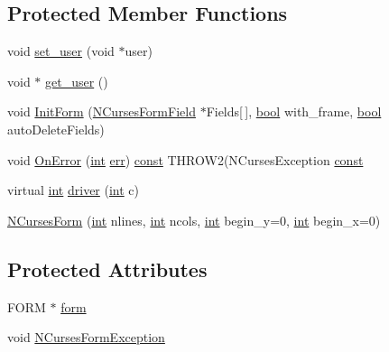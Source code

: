 \subsection*{Protected Member Functions}
\begin{DoxyCompactItemize}
\item 
void \hyperlink{class_n_curses_form_a6f2221b6dc55d231e96381fbb4ddab96}{set\-\_\-user} (void $\ast$user)
\item 
void $\ast$ \hyperlink{class_n_curses_form_a2558962a139eb4b8f5332c7b9af89de0}{get\-\_\-user} ()
\item 
void \hyperlink{class_n_curses_form_a934f8f99161c23cb42a6dcb6ee2af596}{Init\-Form} (\hyperlink{class_n_curses_form_field}{N\-Curses\-Form\-Field} $\ast$Fields\mbox{[}$\,$\mbox{]}, \hyperlink{term__entry_8h_a002004ba5d663f149f6c38064926abac}{bool} with\-\_\-frame, \hyperlink{term__entry_8h_a002004ba5d663f149f6c38064926abac}{bool} auto\-Delete\-Fields)
\item 
void \hyperlink{class_n_curses_form_ace240151d743d042679f640ad8fef747}{On\-Error} (\hyperlink{term__entry_8h_ad65b480f8c8270356b45a9890f6499ae}{int} \hyperlink{class_n_curses_panel_a36889096b2df7770196fa535c6333068}{err}) \hyperlink{term__entry_8h_a57bd63ce7f9a353488880e3de6692d5a}{const} T\-H\-R\-O\-W2(N\-Curses\-Exception \hyperlink{term__entry_8h_a57bd63ce7f9a353488880e3de6692d5a}{const} 
\item 
virtual \hyperlink{term__entry_8h_ad65b480f8c8270356b45a9890f6499ae}{int} \hyperlink{class_n_curses_form_a5e049a5ced3d2515f9ee5027bd20dc3f}{driver} (\hyperlink{term__entry_8h_ad65b480f8c8270356b45a9890f6499ae}{int} c)
\item 
\hyperlink{class_n_curses_form_a11fea5ab4cc88664da4830a809482e63}{N\-Curses\-Form} (\hyperlink{term__entry_8h_ad65b480f8c8270356b45a9890f6499ae}{int} nlines, \hyperlink{term__entry_8h_ad65b480f8c8270356b45a9890f6499ae}{int} ncols, \hyperlink{term__entry_8h_ad65b480f8c8270356b45a9890f6499ae}{int} begin\-\_\-y=0, \hyperlink{term__entry_8h_ad65b480f8c8270356b45a9890f6499ae}{int} begin\-\_\-x=0)
\end{DoxyCompactItemize}
\subsection*{Protected Attributes}
\begin{DoxyCompactItemize}
\item 
F\-O\-R\-M $\ast$ \hyperlink{class_n_curses_form_a18efc76f814968a2bcc0755b8be00e3f}{form}
\item 
void \hyperlink{class_n_curses_form_a5adb7c528cc1e5b4e994185b9e25fdf6}{N\-Curses\-Form\-Exception}
\end{DoxyCompactItemize}
